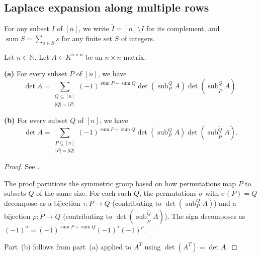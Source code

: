 \subsection{Laplace expansion along multiple rows}

\begin{convention}
\label{conv.det.sum-compl}
For any subset $I$ of $[n]$, we write $\widetilde{I} = [n] \setminus I$ for
its complement, and $\operatorname{sum} S = \sum_{s \in S} s$ for any finite
set $S$ of integers.
\end{convention}

\begin{theorem}
\label{thm.det.laplace-multi}
\leantarget
\leanok
Let $n \in \mathbb{N}$. Let $A \in K^{n \times n}$ be an $n \times n$-matrix.

\textbf{(a)} For every subset $P$ of $[n]$, we have
\[
  \det A = \sum_{\substack{Q \subseteq [n] \\ |Q| = |P|}}
           (-1)^{\operatorname{sum} P + \operatorname{sum} Q}
           \det\left( \operatorname{sub}_P^Q A \right)
           \det\left( \operatorname{sub}_{\widetilde{P}}^{\widetilde{Q}} A \right).
\]

\textbf{(b)} For every subset $Q$ of $[n]$, we have
\[
  \det A = \sum_{\substack{P \subseteq [n] \\ |P| = |Q|}}
           (-1)^{\operatorname{sum} P + \operatorname{sum} Q}
           \det\left( \operatorname{sub}_P^Q A \right)
           \det\left( \operatorname{sub}_{\widetilde{P}}^{\widetilde{Q}} A \right).
\]
\end{theorem}

\begin{proof}
See \cite[Theorem 6.156]{detnotes}.

The proof partitions the symmetric group based on how permutations map $P$
to subsets $Q$ of the same size. For each such $Q$, the permutations
$\sigma$ with $\sigma(P) = Q$ decompose as a bijection $\tau : P \to Q$
(contributing to $\det(\operatorname{sub}_P^Q A)$) and a bijection
$\rho : \widetilde{P} \to \widetilde{Q}$
(contributing to $\det(\operatorname{sub}_{\widetilde{P}}^{\widetilde{Q}} A)$).
The sign decomposes as
$(-1)^\sigma = (-1)^{\operatorname{sum} P + \operatorname{sum} Q}
(-1)^\tau (-1)^\rho$.

Part~(b) follows from part~(a) applied to $A^T$ using $\det(A^T) = \det A$.
\end{proof}


